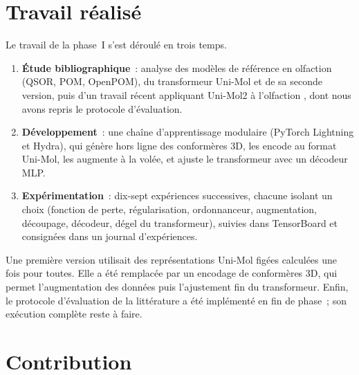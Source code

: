 
\section{Travail réalisé}
\label{sec:TravailRealise}

Le travail de la phase~I s'est déroulé en trois temps.

\begin{enumerate}
   \item \textbf{Étude bibliographique}~: analyse des modèles de référence en olfaction (QSOR, POM, OpenPOM), du transformeur Uni-Mol et de sa seconde version, puis d'un travail récent appliquant Uni-Mol2 à l'olfaction \cite{Han-2026}, dont nous avons repris le protocole d'évaluation.
   \item \textbf{Développement}~: une chaîne d'apprentissage modulaire (PyTorch Lightning et Hydra), qui génère hors ligne des conformères 3D, les encode au format Uni-Mol, les augmente à la volée, et ajuste le transformeur avec un décodeur MLP.
   \item \textbf{Expérimentation}~: dix-sept expériences successives, chacune isolant un choix (fonction de perte, régularisation, ordonnanceur, augmentation, découpage, décodeur, dégel du transformeur), suivies dans TensorBoard et consignées dans un journal d'expériences.
\end{enumerate}

Une première version utilisait des représentations Uni-Mol figées calculées une fois pour toutes.
Elle a été remplacée par un encodage de conformères 3D, qui permet l'augmentation des données puis l'ajustement fin du transformeur.
Enfin, le protocole d'évaluation de la littérature a été implémenté en fin de phase~; son exécution complète reste à faire.


\section{Contribution}
\label{sec:Contribution}


